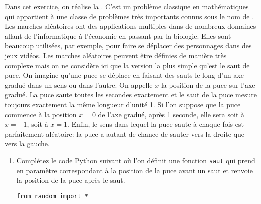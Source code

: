 \begin{exercise}
	Dans cet exercice, on réalise la . C'est un problème classique en mathématiques qui appartient à une classe de problèmes très importants connus sous le nom de . Les marches aléatoires ont des applications multiples dans de nombreux domaines allant de l'informatique à l'économie en passant par la biologie. Elles sont beaucoup utilisées, par exemple, pour faire se déplacer des personnages dans des jeux vidéos. Les marches aléatoires peuvent être définies de manière très complexe mais on ne considère ici que la version la plus simple qu'est le saut de puce. On imagine qu'une puce se déplace en faisant des sauts le long d'un axe gradué dans un sens ou dans l'autre. On appelle $x$ la position de la puce sur l'axe gradué. La puce saute toutes les secondes exactement et le saut de la puce mesure toujours exactement la même longueur d'unité 1. Si l'on suppose que la puce commence à la position $x=0$ de l'axe gradué, après 1 seconde, elle sera soit à $x=-1$, soit à $x=1$. Enfin, le sens dans lequel la puce saute à chaque fois est parfaitement aléatoire: la puce a autant de chance de sauter vers la droite que vers la gauche.
	\begin{enumerate}
		\item Complétez le code Python suivant où l'on définit une fonction \texttt{saut} qui prend en paramètre correspondant à la position de la puce avant un saut et renvoie la position de la puce après le saut.
		\begin{center}
			\begin{varwidth}[t]{.5\textwidth}
				\begin{lstlisting}[language=iPython,linewidth = 6cm]
from random import *


\end{lstlisting}
\end{varwidth}
\end{center}
\end{enumerate}
\end{exercise}
